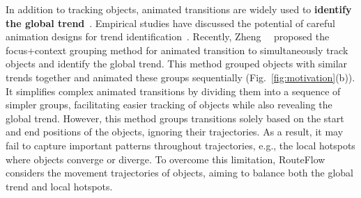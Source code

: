 In addition to tracking objects, animated transitions are widely used to \textbf{identify the global trend}~\cite{roberson2008trend}.
Empirical studies have discussed the potential of careful animation designs for trend identification~\cite{brehmer2020smart,chalbi2020common}. 
Recently, Zheng~\etal~\cite{zheng2018focus+} proposed the focus+context grouping method for animated transition to simultaneously track objects and identify the global trend. 
This method grouped objects with similar trends together and animated these groups sequentially (Fig.~\ref{fig:motivation}(b)).
It simplifies complex animated transitions by dividing them into a sequence of simpler groups, facilitating easier tracking of objects while also revealing the global trend.
However, this method groups transitions solely based on the start and end positions of the objects, ignoring their trajectories.
As a result, it may fail to capture important patterns throughout trajectories, e.g., the local hotspots where objects converge or diverge.
To overcome this limitation, RouteFlow considers the movement trajectories of objects, aiming to balance both the global trend and local hotspots. 